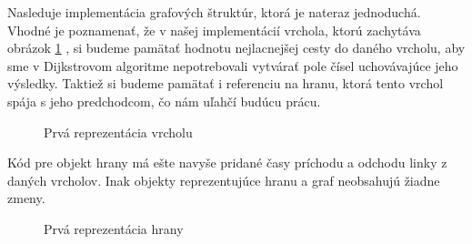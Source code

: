 Nasleduje implementácia grafových štruktúr, ktorá je nateraz jednoduchá. Vhodné je poznamenať, že v našej implementácií vrchola, ktorú zachytáva obrázok \ref{1_Vertex} , si budeme pamätať hodnotu nejlacnejšej cesty do daného vrcholu, aby sme v Dijkstrovom algoritme nepotrebovali vytvárať pole čísel uchovávajúce jeho výsledky. Taktiež si budeme pamätať i referenciu na hranu, ktorá tento vrchol spája s jeho predchodcom, čo nám uľahčí budúcu prácu.\newline

\begin{figure}[H]
  \caption{Prvá reprezentácia vrcholu}
  \label{1_Vertex}
\end{figure}

Kód pre objekt hrany má ešte navyše pridané časy príchodu a odchodu linky z daných vrcholov. Inak objekty reprezentujúce hranu a graf neobsahujú žiadne zmeny.\newline

\begin{figure}[H]
  \caption{Prvá reprezentácia hrany}
  \label{1_Edge}
\end{figure}


